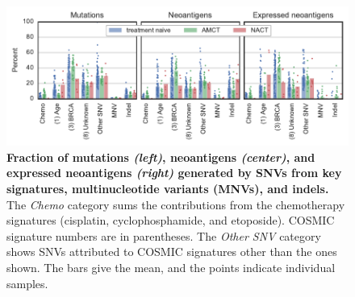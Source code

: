 \begin{figure}[htbp]
\centering
\includegraphics[scale=1.0]{figures/sources_of_mutations_and_neoantigens.pdf}
\caption{\textbf{Fraction of mutations \textit{(left)}, neoantigens \textit{(center)}, and expressed neoantigens \textit{(right)} generated by SNVs from key signatures, multinucleotide variants (MNVs), and indels.} The \textit{Chemo} category sums the contributions from the chemotherapy signatures (cisplatin, cyclophosphamide, and etoposide). COSMIC signature numbers are in parentheses. The \textit{Other SNV} category shows SNVs attributed to COSMIC signatures other than the ones shown. The bars give the mean, and the points indicate individual samples.}
\label{fig:sources}
\end{figure}